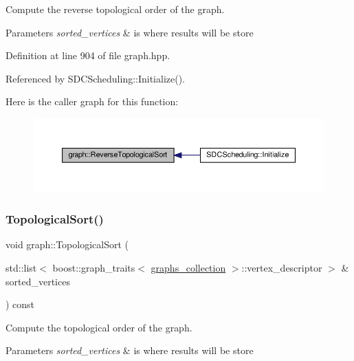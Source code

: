 Compute the reverse topological order of the graph. 


\begin{DoxyParams}{Parameters}
{\em sorted\+\_\+vertices} & is where results will be store \\
\hline
\end{DoxyParams}


Definition at line 904 of file graph.\+hpp.



Referenced by S\+D\+C\+Scheduling\+::\+Initialize().

Here is the caller graph for this function\+:
\nopagebreak
\begin{figure}[H]
\begin{center}
\leavevmode
\includegraphics[width=350pt]{d5/d15/structgraph_a448f3129d511e7a13643d3a06ffe2e64_icgraph}
\end{center}
\end{figure}
\mbox{\label{structgraph_a2466f852a8a9baf976f010474c7a5e03}} 
\subsubsection{\texorpdfstring{Topological\+Sort()}{TopologicalSort()}}
{\footnotesize\ttfamily void graph\+::\+Topological\+Sort (\begin{DoxyParamCaption}\item[{std\+::list$<$ boost\+::graph\+\_\+traits$<$ \hyperlink{structgraphs__collection}{graphs\+\_\+collection} $>$\+::vertex\+\_\+descriptor $>$ \&}]{sorted\+\_\+vertices }\end{DoxyParamCaption}) const\hspace{0.3cm}{\ttfamily [inline]}}



Compute the topological order of the graph. 


\begin{DoxyParams}{Parameters}
{\em sorted\+\_\+vertices} & is where results will be store \\
\hline
\end{DoxyParams}


